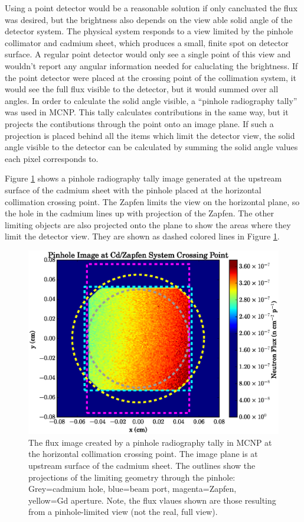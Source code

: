 \documentclass[5p,12pt]{elsarticle}
\begin{document}
Using a point detector would be a reasonable solution if only cancluated the flux was desired, but the brightness also depends on the view able solid angle of the detector system.   The physical system responds to a view limited by the pinhole collimator and cadmium sheet, which produces a small, finite spot on detector surface.  A regular point detector would only see a single point of this view and wouldn't report any angular information needed for caluclating the brightness.  If the point detector were placed at the crossing point of the collimation system, it would see the full flux visible to the detector, but it would summed over all angles.  In order to calculate the solid angle visible, a ``pinhole radiography tally'' was used in MCNP.  This tally calculates contributions in the same way, but it projects the contibutions through the point onto an image plane.  If such a projection is placed behind all the items which limit the detector view, the solid angle visible to the detector can be calculated by summing the solid angle values each pixel corresponds to.

Figure \ref{fig:pinhole_image} shows a pinhole radiography tally image generated at the upstream surface of the cadmium sheet with the pinhole placed at the horizontal collimation crossing point.  The Zapfen limits the view on the horizontal plane, so the hole in the cadmium lines up with projection of the Zapfen.  The other limiting objects are also projected onto the plane to show the areas where they limit the detector view.  They are shown as dashed colored lines in Figure \ref{fig:pinhole_image}.   

\begin{figure}[h!] 
  \centering
    \includegraphics[width=\columnwidth]{graphics/pinhole.eps}
     \caption{The flux image created by a pinhole radiography tally in MCNP at the horizontal collimation crossing point.  The image plane is at upstream surface of the cadmium sheet.  The outlines show the projections of the limiting geometry through the pinhole: Grey=cadmium hole, blue=beam port, magenta=Zapfen, yellow=Gd aperture.  Note, the flux vlaues shown are those resulting from a pinhole-limited view (not the real, full view).  \label{fig:pinhole_image}}
\end{figure}
\end{document}
